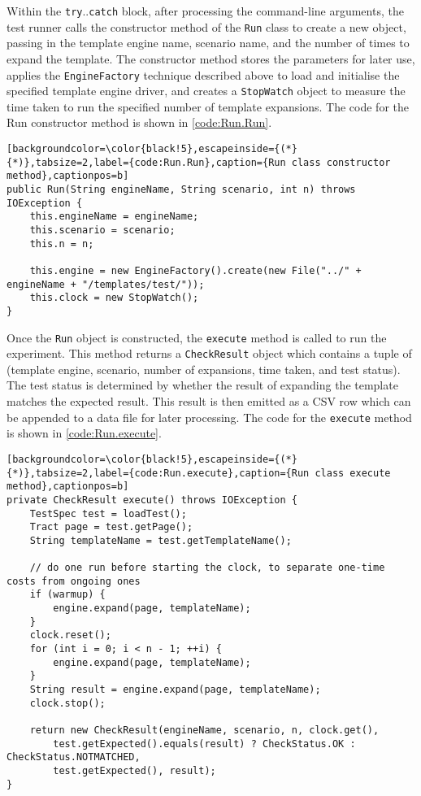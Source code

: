 Within the \verb!try!..\verb!catch! block, after processing the command-line arguments, the test runner calls the constructor method of the \verb!Run! class to create a new object, passing in the \gls{template engine} name, scenario name, and the number of times to expand the template. The constructor method stores the parameters for later use, applies the \verb!EngineFactory! technique described above to load and initialise the specified \gls{template engine} driver, and creates a \verb!StopWatch! object to measure the time taken to run the specified number of template expansions. The code for the Run constructor method is shown in \autoref{code:Run.Run}.

\begin{lstlisting}[backgroundcolor=\color{black!5},escapeinside={(*}{*)},tabsize=2,label={code:Run.Run},caption={Run class constructor method},captionpos=b]
public Run(String engineName, String scenario, int n) throws IOException {
    this.engineName = engineName;
    this.scenario = scenario;
    this.n = n;

    this.engine = new EngineFactory().create(new File("../" + engineName + "/templates/test/"));
    this.clock = new StopWatch();
}
\end{lstlisting}

Once the \verb!Run! object is constructed, the \verb!execute! method is called to run the experiment. This method returns a \verb!CheckResult! object which contains a tuple of (\gls{template engine}, scenario, number of expansions, time taken, and test status). The test status is determined by whether the result of expanding the template matches the expected result. This result is then emitted as a CSV row which can be appended to a data file for later processing. The code for the \verb!execute! method is shown in \autoref{code:Run.execute}.

\begin{lstlisting}[backgroundcolor=\color{black!5},escapeinside={(*}{*)},tabsize=2,label={code:Run.execute},caption={Run class execute method},captionpos=b]
private CheckResult execute() throws IOException {
    TestSpec test = loadTest();
    Tract page = test.getPage();
    String templateName = test.getTemplateName();

    // do one run before starting the clock, to separate one-time costs from ongoing ones
    if (warmup) {
        engine.expand(page, templateName);
    }
    clock.reset();
    for (int i = 0; i < n - 1; ++i) {
        engine.expand(page, templateName);
    }
    String result = engine.expand(page, templateName);
    clock.stop();

    return new CheckResult(engineName, scenario, n, clock.get(),
        test.getExpected().equals(result) ? CheckStatus.OK : CheckStatus.NOTMATCHED,
        test.getExpected(), result);
}
\end{lstlisting}

